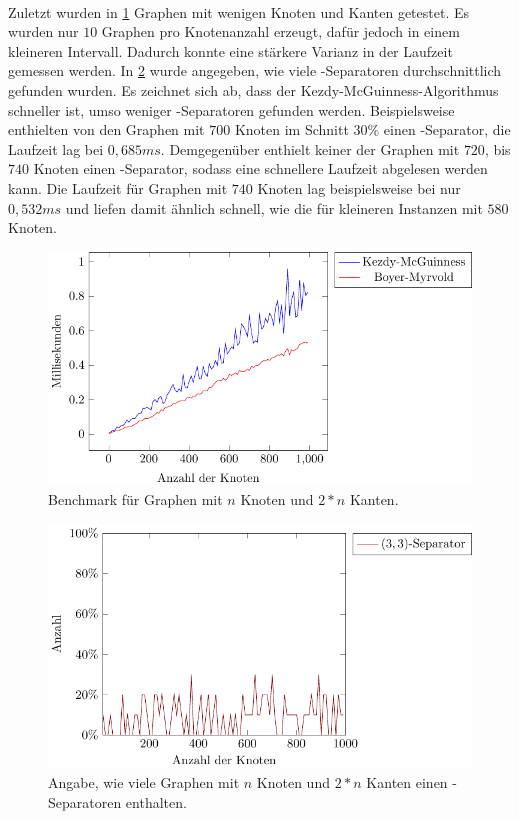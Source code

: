\ \\

Zuletzt wurden in \Abb \ref{fig:Benchmarks-Small} Graphen mit wenigen Knoten und Kanten getestet.
Es wurden nur $10$ Graphen pro Knotenanzahl erzeugt, dafür jedoch in einem kleineren Intervall.
Dadurch konnte eine stärkere Varianz in der Laufzeit gemessen werden.
In \Abb \ref{fig:Statistics-Small} wurde angegeben, wie viele \dd-Separatoren durchschnittlich gefunden wurden.
Es zeichnet sich ab, dass der Kezdy-McGuinness-Algorithmus schneller ist, umso weniger \dd-Separatoren gefunden werden.
Beispielsweise enthielten von den Graphen mit $700$ Knoten im Schnitt $30\%$ einen \dd-Separator, die Laufzeit lag bei $0,685ms$.
Demgegenüber enthielt keiner der Graphen mit $720$, bis $740$ Knoten einen \dd-Separator, sodass eine schnellere Laufzeit abgelesen werden kann.
Die Laufzeit für Graphen mit $740$ Knoten lag beispielsweise bei nur $0,532ms$ und liefen damit ähnlich schnell, wie die für kleineren Instanzen mit $580$ Knoten.

\begin{figure}[H]
  \centering
  \includegraphics[width=\textwidth,height=\textheight,keepaspectratio]{plots/Benchmarks_Small.pdf}
  \caption{Benchmark für Graphen mit $n$ Knoten und $2*n$ Kanten.}
  \label{fig:Benchmarks-Small}
\end{figure}

\begin{figure}[H]
  \centering
  \includegraphics[width=\textwidth,height=\textheight,keepaspectratio]{plots/Statistics_Small.pdf}
  \caption{Angabe, wie viele Graphen mit $n$ Knoten und $2*n$ Kanten einen \dd-Separatoren enthalten.}
  \label{fig:Statistics-Small}
\end{figure}
